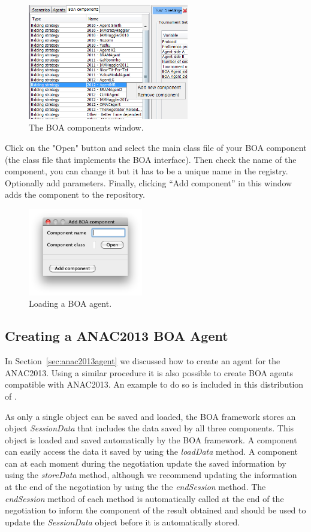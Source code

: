 \documentclass[]{article}
\begin{document}
\begin{figure}[h!] 
	\center
	\includegraphics[width=7cm]{media/AddBOA.png}
	\caption{The BOA components window.}
	\label{fig:boacomponents}
\end{figure}

Click on the "Open" button and select the main class file of your BOA component (the class file that implements the BOA interface). Then check the name of the component, you can change it but it has to be a unique name in the registry. Optionally add parameters. Finally, clicking ``Add component'' in this window adds the component to the repository.

\begin{figure}[h!] 
	\center
	\includegraphics[width=5cm]{media/LoadBOA.png}
	\caption{Loading a BOA agent.}
	\label{fig:loadBOA}
\end{figure}


\subsection{Creating a ANAC2013 BOA Agent}\label{sec:anac2013agentBOA}
In Section~\ref{sec:anac2013agent} we discussed how to create an agent for the ANAC2013. Using a similar procedure it is also possible to create BOA agents compatible with ANAC2013. An example to do so is included in this distribution of \Genius.

As only a single object can be saved and loaded, the BOA framework stores an object \textit{SessionData} that includes the data saved by all three components. This object is loaded and saved automatically by the BOA framework. A component can easily access the data it saved by using the \textit{loadData} method. A component can at each moment during the negotiation update the saved information by using the \textit{storeData} method, although we recommend updating the information at the end of the negotiation by using the the \textit{endSession} method. The \textit{endSession} method of each method is automatically called at the end of the negotiation to inform the component of the result obtained and should be used to update the \textit{SessionData} object before it is automatically stored.
\end{document}
